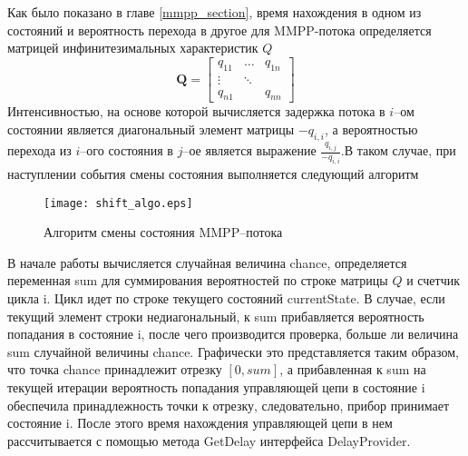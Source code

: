 Как было показано в главе \ref{mmpp_section}, время нахождения в одном из состояний и вероятность перехода в другое для MMPP-потока определяется матрицей инфинитезимальных характеристик $Q$
\begin{equation*}
	\boldsymbol{Q}=\begin{bmatrix}
		q_{11} &  \dots &  q_{1n}\\
		\vdots & \ddots &  \\
		q_{n1} &    	&	q_{nn}
	\end{bmatrix}
\end{equation*}
Интенсивностью, на основе которой вычисляется задержка потока в $i$--ом состоянии является диагональный элемент матрицы $-q_{i,i}$, а вероятностью перехода из $i$--ого состояния в $j$--ое является выражение $\frac{q_{i,j}}{-q_{i,i}}$.В таком случае, при наступлении события смены состояния выполняется следующий алгоритм
   \begin{figure}[H]
  	\centering
  	\texttt{[image: shift\_algo.eps]}
  	\caption{Алгоритм смены состояния MMPP--потока}
  	\label{shift_algo_uml}
  \end{figure}
В начале работы вычисляется случайная величина chance, определяется переменная sum для суммирования вероятностей по строке матрицы $Q$ и счетчик цикла i. Цикл идет по строке текущего состояний currentState. В случае, если текущий элемент строки недиагональный, к sum прибавляется вероятность попадания в состояние i, после чего производится проверка, больше ли величина sum случайной величины chance. Графически это представляется таким образом, что точка chance принадлежит отрезку $[0,sum]$, а прибавленная к sum на текущей итерации вероятность попадания управляющей цепи в состояние i обеспечила принадлежность точки к отрезку, следовательно, прибор принимает состояние i. После этого время нахождения управляющей цепи в нем рассчитывается с помощью метода GetDelay интерфейса DelayProvider.
\clearpage
